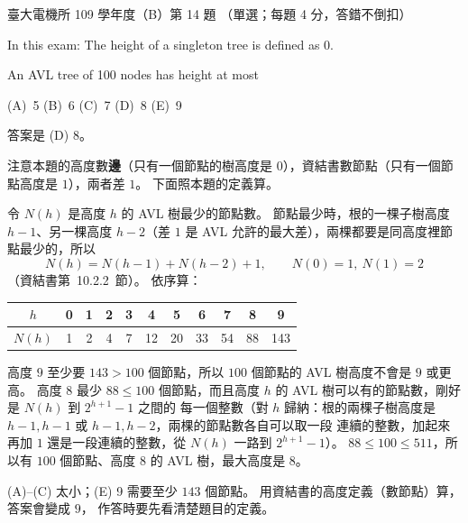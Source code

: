 \begin{pastexam}[label={px:ntu-109-ee-ds-14}]{臺大電機所 109 學年度（B）第 14 題}
（單選；每題 4 分，答錯不倒扣）

In this exam: The height of a singleton tree is defined as 0.

An AVL tree of 100 nodes has height at most

(A)~5 \qquad (B)~6 \qquad (C)~7 \qquad (D)~8 \qquad (E)~9
\end{pastexam}

\begin{pastsoln}
答案是 (D) 8。

注意本題的高度數\textbf{邊}（只有一個節點的樹高度是 $0$），資結書數節點（只有一個節點高度是
$1$），兩者差 $1$。 下面照本題的定義算。

令 $N(h)$ 是高度 $h$ 的 AVL 樹最少的節點數。 節點最少時，根的一棵子樹高度 $h - 1$、另一棵高度
$h - 2$（差 $1$ 是 AVL 允許的最大差），兩棵都要是同高度裡節點最少的，所以
\[
N(h) = N(h - 1) + N(h - 2) + 1, \qquad N(0) = 1,\ N(1) = 2
\]
（資結書第~10.2.2~節）。 依序算：
\begin{center}
\begin{tabular}{c*{10}{c}}
\toprule
$h$ & 0 & 1 & 2 & 3 & 4 & 5 & 6 & 7 & 8 & 9 \\
\midrule
$N(h)$ & 1 & 2 & 4 & 7 & 12 & 20 & 33 & 54 & 88 & 143 \\
\bottomrule
\end{tabular}
\end{center}
高度 $9$ 至少要 $143 > 100$ 個節點，所以 $100$ 個節點的 AVL 樹高度不會是 $9$ 或更高。 高度 $8$ 最少
$88 \le 100$ 個節點，而且高度 $h$ 的 AVL 樹可以有的節點數，剛好是 $N(h)$ 到 $2^{h+1} - 1$ 之間的
每一個整數（對 $h$ 歸納：根的兩棵子樹高度是 $h-1, h-1$ 或 $h-1, h-2$，兩棵的節點數各自可以取一段
連續的整數，加起來再加 $1$ 還是一段連續的整數，從 $N(h)$ 一路到 $2^{h+1} - 1$）。 $88 \le 100 \le
511$，所以有 $100$ 個節點、高度 $8$ 的 AVL 樹，最大高度是 $8$。

(A)--(C) 太小；(E) 9 需要至少 $143$ 個節點。 用資結書的高度定義（數節點）算，答案會變成 $9$，
作答時要先看清楚題目的定義。
\end{pastsoln}
